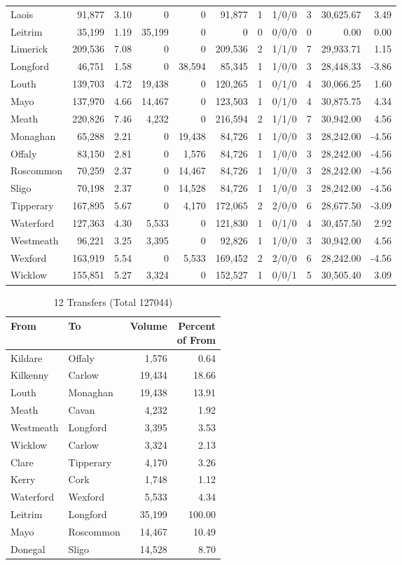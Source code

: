 \documentclass[a4paper]{article}
\begin{document}
\begin{longtable}{lrrrrrrlrrr}
Laois&91,877& 3.10&0&0&91,877&1&1/0/0&3&30,625.67& 3.49\\ 
Leitrim&35,199& 1.19&35,199&0&0&0&0/0/0&0& 0.00& 0.00\\ 
Limerick&209,536& 7.08&0&0&209,536&2&1/1/0&7&29,933.71& 1.15\\ 
Longford&46,751& 1.58&0&38,594&85,345&1&1/0/0&3&28,448.33&-3.86\\ 
Louth&139,703& 4.72&19,438&0&120,265&1&0/1/0&4&30,066.25& 1.60\\ 
Mayo&137,970& 4.66&14,467&0&123,503&1&0/1/0&4&30,875.75& 4.34\\ 
Meath&220,826& 7.46&4,232&0&216,594&2&1/1/0&7&30,942.00& 4.56\\ 
Monaghan&65,288& 2.21&0&19,438&84,726&1&1/0/0&3&28,242.00&-4.56\\ 
Offaly&83,150& 2.81&0&1,576&84,726&1&1/0/0&3&28,242.00&-4.56\\ 
Roscommon&70,259& 2.37&0&14,467&84,726&1&1/0/0&3&28,242.00&-4.56\\ 
Sligo&70,198& 2.37&0&14,528&84,726&1&1/0/0&3&28,242.00&-4.56\\ 
Tipperary&167,895& 5.67&0&4,170&172,065&2&2/0/0&6&28,677.50&-3.09\\ 
Waterford&127,363& 4.30&5,533&0&121,830&1&0/1/0&4&30,457.50& 2.92\\ 
Westmeath&96,221& 3.25&3,395&0&92,826&1&1/0/0&3&30,942.00& 4.56\\ 
Wexford&163,919& 5.54&0&5,533&169,452&2&2/0/0&6&28,242.00&-4.56\\ 
Wicklow&155,851& 5.27&3,324&0&152,527&1&0/0/1&5&30,505.40& 3.09\\ 
\end{longtable}

\begin{table}[htbp]
\caption{12 Transfers (Total 127044)}
\centering
\begin{tabular}{llrr} \toprule
From &To &Volume &\shortstack{Percent\\of From} \\ \midrule
Kildare&Offaly&1,576& 0.64\\ 
Kilkenny&Carlow&19,434&18.66\\ 
Louth&Monaghan&19,438&13.91\\ 
Meath&Cavan&4,232& 1.92\\ 
Westmeath&Longford&3,395& 3.53\\ 
Wicklow&Carlow&3,324& 2.13\\ 
Clare&Tipperary&4,170& 3.26\\ 
Kerry&Cork&1,748& 1.12\\ 
Waterford&Wexford&5,533& 4.34\\ 
Leitrim&Longford&35,199&100.00\\ 
Mayo&Roscommon&14,467&10.49\\ 
Donegal&Sligo&14,528& 8.70\\ 
\bottomrule
\end{tabular}
\end{table}
\end{document}
